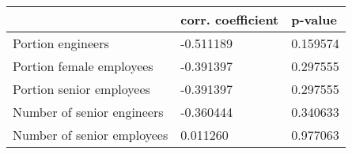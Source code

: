 \begin{tabular}{l|ll}
\toprule
 & corr. coefficient & p-value \\ \hline
\midrule
Portion engineers & -0.511189 & 0.159574 \\
Portion female employees & -0.391397 & 0.297555 \\
Portion senior employees & -0.391397 & 0.297555 \\
Number of senior engineers & -0.360444 & 0.340633 \\
Number of senior employees & 0.011260 & 0.977063 \\
\bottomrule
\end{tabular}
